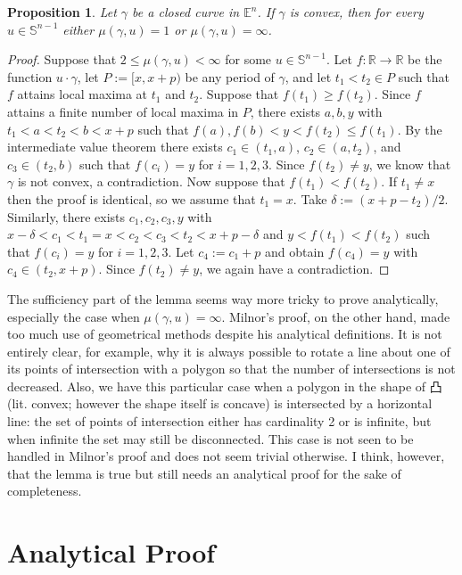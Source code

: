 \documentclass{amsart}
\newtheorem{proposition}{Proposition}[section]
\theoremstyle{definition}
\theoremstyle{remark}
\begin{document}
\begin{proposition}
    Let $\gamma$ be a closed curve in $\mathbb{E}^n$.
    If $\gamma$ is convex, then for every $u\in\mathbb{S}^{n-1}$
    either $\mu(\gamma,u)=1$ or $\mu(\gamma,u)=\infty$.
\end{proposition}

\begin{proof}
    Suppose that $2\le\mu(\gamma,u)<\infty$
    for some $u\in\mathbb{S}^{n-1}$.
    Let $f:\mathbb{R}\to\mathbb{R}$ be the function $u\cdot\gamma$,
    let $P:=[x,x+p)$ be any period of $\gamma$, and let $t_1<t_2\in P$
    such that $f$ attains local maxima at $t_1$ and $t_2$.
    Suppose that $f(t_1)\ge f(t_2)$.
    Since $f$ attains a finite number of local maxima in $P$,
    there exists $a,b,y$ with $t_1<a<t_2<b<x+p$ such that
    $f(a),f(b)<y<f(t_2)\le f(t_1)$.
    By the intermediate value theorem there exists
    $c_1\in(t_1,a)$, $c_2\in(a,t_2)$, and $c_3\in(t_2,b)$ such that
    $f(c_i)=y$ for $i=1,2,3$. Since $f(t_2)\ne y$, we know that
    $\gamma$ is not convex, a contradiction.
    Now suppose that $f(t_1)<f(t_2)$.
    If $t_1\ne x$ then the proof is identical,
    so we assume that $t_1=x$. Take $\delta:=(x+p-t_2)/2$.
    Similarly, there exists $c_1,c_2,c_3,y$ with
    $x-\delta<c_1<t_1=x<c_2<c_3<t_2<x+p-\delta$
    and $y<f(t_1)<f(t_2)$ such that
    $f(c_i)=y$ for $i=1,2,3$.
    Let $c_4:=c_1+p$ and obtain $f(c_4)=y$ with $c_4\in(t_2,x+p)$.
    Since $f(t_2)\ne y$, we again have a contradiction.
\end{proof}

The sufficiency part of the lemma seems way more tricky to prove
analytically, especially the case when $\mu(\gamma,u)=\infty$.
Milnor's proof, on the other hand, made too much use of
geometrical methods despite his analytical definitions.
It is not entirely clear, for example, why it is always possible
to rotate a line about one of its points of intersection with
a polygon so that the number of intersections is not decreased.
Also, we have this particular case when a polygon in the shape of 凸
(lit. convex; however the shape itself is concave)
is intersected by a horizontal line: the set of points of intersection
either has cardinality 2 or is infinite, but when infinite
the set may still be disconnected. This case is not seen to
be handled in Milnor's proof and does not seem trivial otherwise.
I think, however, that the lemma is true but still needs
an analytical proof for the sake of completeness.

\section{Analytical Proof}
\end{document}
